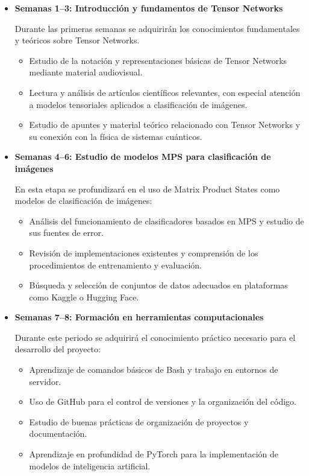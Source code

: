 \begin{itemize}
\item \textbf{Semanas 1--3: Introducción y fundamentos de Tensor Networks}

Durante las primeras semanas se adquirirán los conocimientos fundamentales y teóricos sobre Tensor Networks. 
\begin{itemize}
\item Estudio de la notación y representaciones básicas de Tensor Networks mediante material audiovisual.
\item Lectura y análisis de artículos científicos relevantes, con especial atención a modelos tensoriales aplicados a clasificación de imágenes.
\item Estudio de apuntes y material teórico relacionado con Tensor Networks y su conexión con la física de sistemas cuánticos.
\end{itemize}

\item \textbf{Semanas 4--6: Estudio de modelos MPS para clasificación de imágenes}

En esta etapa se profundizará en el uso de Matrix Product States como modelos de clasificación de imágenes:
\begin{itemize}
\item Análisis del funcionamiento de clasificadores basados en MPS y estudio de sus fuentes de error.
\item Revisión de implementaciones existentes y comprensión de los procedimientos de entrenamiento y evaluación.
\item Búsqueda y selección de conjuntos de datos adecuados en plataformas como Kaggle o Hugging Face.
\end{itemize}

\item \textbf{Semanas 7--8: Formación en herramientas computacionales}

Durante este periodo se adquirirá el conocimiento práctico necesario para el desarrollo del proyecto:
\begin{itemize}
\item Aprendizaje de comandos básicos de Bash y trabajo en entornos de servidor.
\item Uso de GitHub para el control de versiones y la organización del código.
\item Estudio de buenas prácticas de organización de proyectos y documentación.
\item Aprendizaje en profundidad de PyTorch para la implementación de modelos de inteligencia artificial.
\end{itemize}


\end{itemize}
